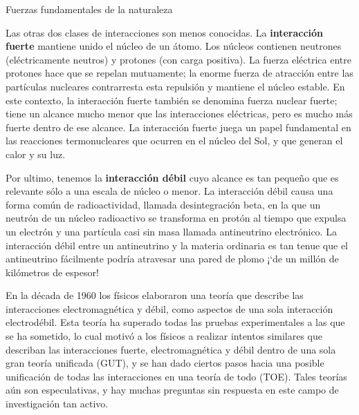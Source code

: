\begin{myblock}{Fuerzas fundamentales de la naturaleza}
\begin{small}
\vspace{2mm} Las otras dos clases de interacciones son menos conocidas. La \textbf{interacción fuerte} mantiene unido el núcleo de un átomo. Los núcleos contienen neutrones (eléctricamente neutros) y protones (con carga positiva). La fuerza eléctrica entre protones hace que se repelan mutuamente; la enorme fuerza de atracción entre las partículas nucleares contrarresta esta repulsión y mantiene el núcleo estable. En este contexto, la interacción fuerte también se denomina fuerza nuclear fuerte; tiene un alcance mucho menor que las interacciones eléctricas, pero es mucho más fuerte dentro de ese alcance. La interacción fuerte juega un papel fundamental en las reacciones termonucleares que ocurren en el núcleo del Sol, y que generan el calor y su luz. 

\vspace{2mm} Por ultimo, tenemos la \textbf{interacción débil} cuyo alcance es tan pequeño que es relevante sólo a una escala de núcleo o menor. La interacción débil causa una forma común de radioactividad, llamada desintegración beta, en la que un neutrón de un núcleo radioactivo se transforma en protón al tiempo que expulsa un electrón y una partícula casi sin masa llamada antineutrino electrónico. La interacción débil entre un antineutrino y la materia ordinaria es tan tenue que el antineutrino fácilmente podría atravesar una pared de plomo ¡`de un millón de kilómetros de espesor! 

\vspace{2mm} En la década de 1960 los físicos elaboraron una teoría que describe las interacciones electromagnética y débil, como aspectos de una sola interacción electrodébil. Esta teoría ha superado todas las pruebas experimentales a las que se ha sometido, lo cual motivó a los físicos a realizar intentos similares que describan las interacciones fuerte, electromagnética y débil dentro de una sola gran teoría unificada (GUT), y se han dado ciertos pasos hacia una posible unificación de todas las interacciones en una teoría de todo (TOE). Tales teorías aún son especulativas, y hay muchas preguntas sin respuesta en este campo de investigación tan activo. 
	
 \end{small}

\end{myblock}
 
 
 
 
 
